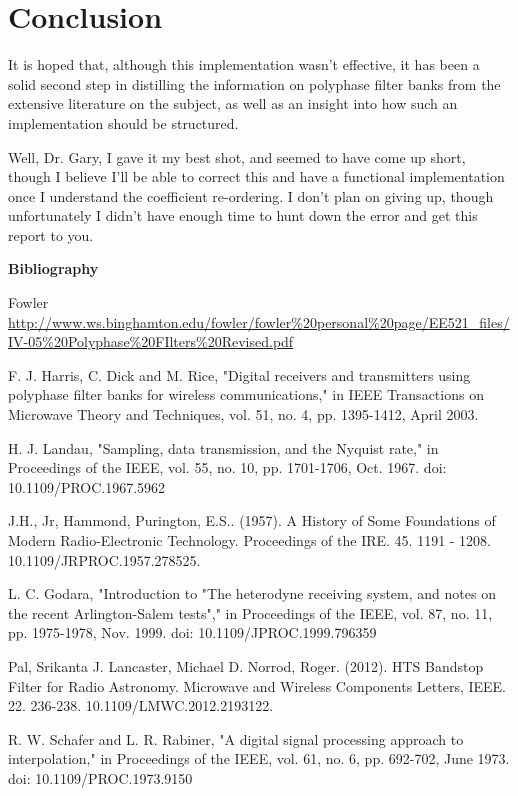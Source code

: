 \documentclass{report}
\begin{document}
\chapter{Conclusion}

It is hoped that, although this implementation wasn't effective, it has been a solid second step in distilling the information on polyphase filter banks from the extensive literature on the subject, as well as an insight into how such an implementation should be structured.

Well, Dr. Gary, I gave it my best shot, and seemed to have come up short, though I believe I'll be able to correct this and have a functional implementation once I understand the coefficient re-ordering.  I don't plan on giving up, though unfortunately I didn't have enough time to hunt down the error and get this report to you.  

\newpage

\textbf{Bibliography}

Fowler \url{http://www.ws.binghamton.edu/fowler/fowler%20personal%20page/EE521_files/IV-05%20Polyphase%20FIlters%20Revised.pdf}

F. J. Harris, C. Dick and M. Rice, "Digital receivers and transmitters using polyphase filter banks for wireless communications," in IEEE Transactions on Microwave Theory and Techniques, vol. 51, no. 4, pp. 1395-1412, April 2003.

H. J. Landau, "Sampling, data transmission, and the Nyquist rate," in Proceedings of the IEEE, vol. 55, no. 10, pp. 1701-1706, Oct. 1967.
doi: 10.1109/PROC.1967.5962

J.H., Jr, Hammond,  Purington, E.S.. (1957). A History of Some Foundations of Modern Radio-Electronic Technology. Proceedings of the IRE. 45. 1191 - 1208. 10.1109/JRPROC.1957.278525. 

L. C. Godara, "Introduction to "The heterodyne receiving system, and notes on the recent Arlington-Salem tests"," in Proceedings of the IEEE, vol. 87, no. 11, pp. 1975-1978, Nov. 1999.
doi: 10.1109/JPROC.1999.796359

Pal, Srikanta  J. Lancaster, Michael D. Norrod, Roger. (2012). HTS Bandstop Filter for Radio Astronomy. Microwave and Wireless Components Letters, IEEE. 22. 236-238. 10.1109/LMWC.2012.2193122. 

R. W. Schafer and L. R. Rabiner, "A digital signal processing approach to interpolation," in Proceedings of the IEEE, vol. 61, no. 6, pp. 692-702, June 1973.
doi: 10.1109/PROC.1973.9150
\end{document}
